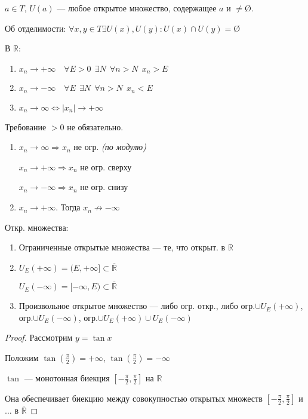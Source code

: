 $a\in T$, $U(a)$ --- любое открытое множество, содержащее $a$ и $\not =$\O.

\begin{axiom}
    Об отделимости: $\forall x,y\in T \exists U(x), U(y) : U(x)\cap U(y)=$\O  
\end{axiom}

\begin{definition}
В $\mathbb{R}$:
\begin{enumerate}
    \item $x_n\to +\infty \quad \forall E>0 \ \ \exists N \ \ \forall n>N \ \ x_n>E$
    \item $x_n\to -\infty \quad \forall E \ \ \exists N \ \ \forall n>N \ \ x_n<E$
    \item $x_n\to \infty \Leftrightarrow |x_n|\to +\infty$
\end{enumerate}
\end{definition}

\begin{remark}
Требование $>0$ не обязательно.
\end{remark}

\begin{remark}
\begin{enumerate}
    \item $x_n\to \infty \Rightarrow x_n$ не огр. \textit{(по модулю)}

    $x_n\to +\infty \Rightarrow x_n$ не огр. сверху

    $x_n\to -\infty \Rightarrow x_n$ не огр. снизу
    \item $x_n\to +\infty$. Тогда $x_n\not\to -\infty$
\end{enumerate}
\end{remark}

Откр. множества:
\begin{enumerate}
    \item Ограниченные открытые множества --- те, что открыт. в $\mathbb{R}$
    \item $U_E (+\infty)=(E,+\infty] \subset\mathbb{\overline R}$
    
    $U_E(-\infty) = [-\infty,E) \subset\mathbb{\overline R}$
    \item Произвольное открытое множество --- либо огр. откр., либо огр.$\cup U_E(+\infty)$, огр.$\cup U_E(-\infty)$, огр.$\cup U_E(+\infty)\cup U_E(-\infty)$
\end{enumerate}

\begin{proof}
Рассмотрим $y=\tan x$

Положим $\tan (\frac{\pi}{2})=+\infty$, $\tan (\frac{\pi}{2})=-\infty$

$\tan$ --- монотонная биекция $[-\frac{\pi}{2}, \frac{\pi}{2}]$ на $\mathbb{R}$

Она обеспечивает биекцию между совокупностью открытых множеств $[-\frac{\pi}{2}, \frac{\pi}{2}]$ и $\ldots$ в $\mathbb{\overline R}$
\end{proof}

